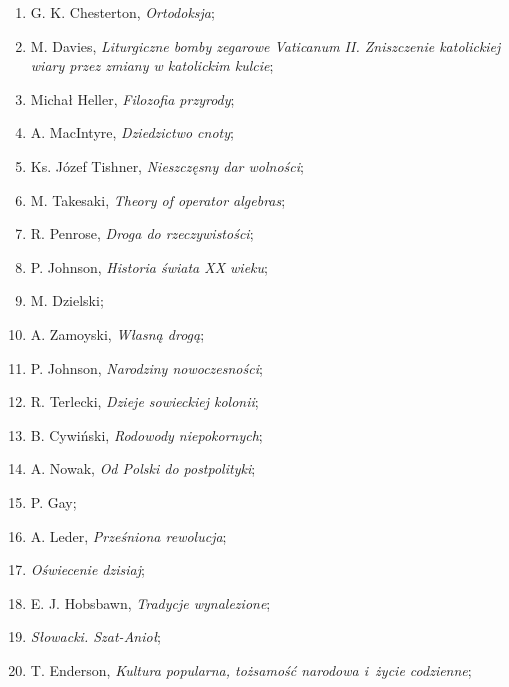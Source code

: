 \documentclass[a4paper,11pt]{article}
\begin{document}
\begin{enumerate}
\item G. K. Chesterton, \textit{Ortodoksja};

\item M. Davies, \textit{Liturgiczne bomby zegarowe Vaticanum II.
    Zniszczenie katolickiej wiary przez zmiany w katolickim kulcie};

\item Michał Heller, \textit{Filozofia przyrody};

\item A. MacIntyre, \textit{Dziedzictwo cnoty};

\item Ks. Józef Tishner, \textit{Nieszczęsny dar wolności};

\item M. Takesaki, \textit{Theory of operator algebras};

\item R. Penrose, \textit{Droga do rzeczywistości};

\item P. Johnson, \textit{Historia świata XX wieku};

\item M. Dzielski;

\item A. Zamoyski, \textit{Własną drogą};

\item P. Johnson, \textit{Narodziny nowoczesności};

\item R. Terlecki, \textit{Dzieje sowieckiej kolonii};

\item B. Cywiński, \textit{Rodowody niepokornych};

\item A. Nowak, \textit{Od Polski do postpolityki};

\item P. Gay;

\item A. Leder, \textit{Prześniona rewolucja};

\item \textit{Oświecenie dzisiaj};

\item E. J. Hobsbawn, \textit{Tradycje wynalezione};

\item \textit{Słowacki. Szat-Anioł};

\item T. Enderson, \textit{Kultura popularna, tożsamość narodowa i~życie
    codzienne};


\end{enumerate}
\end{document}
